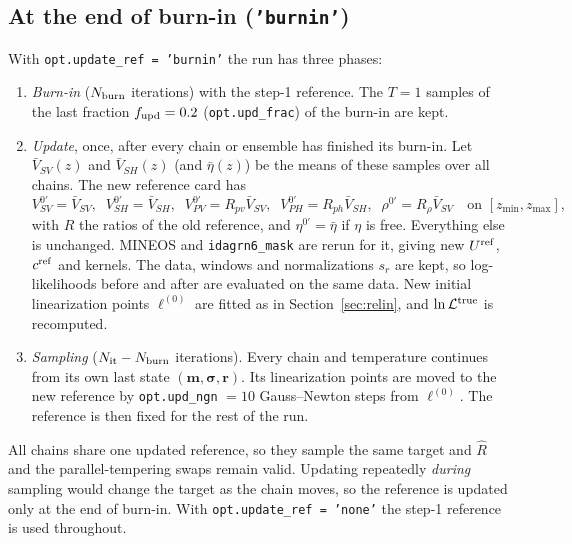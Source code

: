 \documentclass[11pt]{article}
\newcommand{\vsv}{V_{SV}}
\newcommand{\vsh}{V_{SH}}
\newcommand{\vpv}{V_{PV}}
\newcommand{\vph}{V_{PH}}
\begin{document}
\subsection{At the end of burn-in (\texttt{'burnin'})}
With \texttt{opt.update\_ref = 'burnin'} the run has three phases:
\begin{enumerate}
\item \emph{Burn-in} ($N_{\rm burn}$ iterations) with the step-1 reference.
  The $T=1$ samples of the last fraction $f_{\rm upd}=0.2$
  (\texttt{opt.upd\_frac}) of the burn-in are kept.
\item \emph{Update}, once, after every chain or ensemble has finished its
  burn-in. Let $\bar\vsv(z)$ and $\bar\vsh(z)$ (and $\bar\eta(z)$) be the
  means of these samples over all chains. The new reference card has
  \begin{equation}
   \vsv^{0\prime}=\bar\vsv,\;\; \vsh^{0\prime}=\bar\vsh,\;\;
   \vpv^{0\prime}=R_{pv}\bar\vsv,\;\; \vph^{0\prime}=R_{ph}\bar\vsh,\;\;
   \rho^{0\prime}=R_\rho\bar\vsv\quad\text{on }[z_{\min},z_{\max}],
  \end{equation}
  with $R$ the ratios of the old reference, and $\eta^{0\prime}=\bar\eta$
  if $\eta$ is free. Everything else is unchanged. MINEOS and
  \texttt{idagrn6\_mask} are rerun for it, giving new $U^{\rm ref}$,
  $c^{\rm ref}$ and kernels. The data, windows and normalizations $s_r$
  are kept, so log-likelihoods before and after are evaluated on the same
  data. New initial linearization points $\bm\ell^{(0)}$ are fitted as in
  Section~\ref{sec:relin}, and $\ln\mathcal{L}^{\rm true}$ is recomputed.
\item \emph{Sampling} ($N_{\rm it}-N_{\rm burn}$ iterations). Every chain
  and temperature continues from its own last state $(\mathbf{m},\bm\sigma,\mathbf{r})$.
  Its linearization points are moved to the new reference by
  \texttt{opt.upd\_ngn} $=10$ Gauss--Newton steps from $\bm\ell^{(0)}$.
  The reference is then fixed for the rest of the run.
\end{enumerate}
All chains share one updated reference, so they sample the same target
and $\hat R$ and the parallel-tempering swaps remain valid. Updating
repeatedly \emph{during} sampling would change the target as the chain
moves, so the reference is updated only at the end of burn-in. With
\texttt{opt.update\_ref = 'none'} the step-1 reference is used
throughout.
\end{document}
